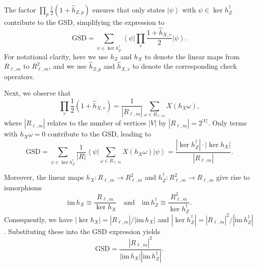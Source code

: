\documentclass[aps,prl,english,superscriptaddress,twocolumn,tightenlines,showpacs,longbibliography,floatfix,amsfonts]{revtex4-2}
\begin{document}
The factor $\prod_{p}\frac{1}{2}(1+\hat{h}_{Z,p})$ ensures that only
states $\left|\psi\right\rangle $ with $\psi\in\ker h_{Z}^{\dagger}$
contribute to the GSD, simplifying the expression to 
\begin{equation}
	\text{GSD}=\sum_{\psi\in\ker h_{Z}^{\dagger}}\left\langle \psi\right|\prod_{v}\frac{1+\hat{h}_{X,v}}{2}\left|\psi\right\rangle .
\end{equation}
For notational clarity, here we use $h_{Z}$ and $h_{X}$ to denote the linear maps from $R_{\ell,m}$
to $R_{\ell,m}^{2}$, and we use $\hat{h}_{Z,p}$ and $\hat{h}_{X,v}$ to denote the corresponding check operators.

Next, we observe that 
\begin{equation}
	\prod_{v}\frac{1}{2}(1+\hat{h}_{X,v})=\frac{1}{|R_{\ell,m}|}\sum_{\omega\in R_{\ell,m}}X\left(h_{X}\omega\right),
\end{equation}
where $|R_{\ell,m}|$ relates to the number of vertices $\left|V\right|$
by $|R_{\ell,m}|=2^{|V|}$. Only terms with $h_{X}\omega=0$ contribute
to the GSD, leading to
\begin{equation}
	\text{GSD}=\sum_{\psi\in\ker h_{Z}^{\dagger}}\frac{1}{\left|R\right|}\left\langle \psi\right|\sum_{\omega\in R_{\ell,m}}X\left(h_{X}\omega\right)\left|\psi\right\rangle =\frac{|\ker h_{Z}^{\dagger}|\cdot\left|\ker h_{X}\right|}{\left|R_{\ell,m}\right|}.
\end{equation}

Moreover, the linear maps $h_{X}:R_{\ell,m}\rightarrow R_{\ell,m}^{2}$
and $h_{Z}^{\dagger}:R_{\ell,m}^{2}\rightarrow R_{\ell,m}$ give rise
to ismorphisms 
\begin{equation}
	\text{im}\,h_{X}\cong\frac{R_{\ell,m}}{\ker h_{X}}\quad\text{and}\quad\text{im}\,h_{Z}^{\dagger}\cong\frac{R_{\ell,m}^{2}}{\ker h_{Z}^{\dagger}}.
\end{equation}
Consequently, we have $\left|\ker h_{X}\right|=|R_{\ell,m}|/\left|\text{im}\,h_{X}\right|$
and $|\ker h_{Z}^{\dagger}|=|R_{\ell,m}|^{2}/|\text{im}\,h_{Z}^{\dagger}|$.
Substituting these into the GSD expression yields
\begin{equation}
	\text{GSD}=\frac{|R_{\ell,m}|^{2}}{\left|\text{im}\,h_{X}\right||\text{im}\,h_{Z}^{\dagger}|}.
\end{equation}
\end{document}
